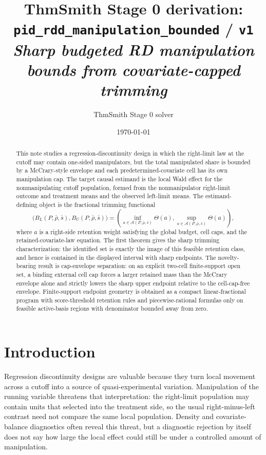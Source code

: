 \documentclass[11pt]{article}
\title{ThmSmith Stage 0 derivation: \texttt{pid\_rdd\_manipulation\_bounded} / \texttt{v1}%
  \\ \large\textit{Sharp budgeted RD manipulation bounds from covariate-capped trimming}}
\author{ThmSmith Stage 0 solver}
\date{\today}
\theoremstyle{definition}
\theoremstyle{plain}
\theoremstyle{remark}
\begin{document}
\maketitle


\begin{abstract}
This note studies a regression-discontinuity design in which the right-limit law at the
cutoff may contain one-sided manipulators, but the total manipulated share is bounded by a
McCrary-style envelope and each predetermined-covariate cell has its own manipulation cap.
The target causal estimand is the local Wald effect for the nonmanipulating cutoff
population, formed from the nonmanipulator right-limit outcome and treatment means and the
observed left-limit means.  The estimand-defining object is the fractional trimming
functional
\[
  \bigl(B_L(P,\bar\rho,\bar s),B_U(P,\bar\rho,\bar s)\bigr)
  =
  \left(\inf_{a\in\mathcal A(P,\bar\rho,\bar s)}\Theta(a),
  \sup_{a\in\mathcal A(P,\bar\rho,\bar s)}\Theta(a)\right),
\]
where \(a\) is a right-side retention weight satisfying the global budget, cell caps, and
the retained-covariate-law equation.  The first theorem gives the sharp trimming
characterization: the identified set is exactly the image of this feasible retention class,
and hence is contained in the displayed interval with sharp endpoints.  The novelty-bearing
result is cap-envelope separation: on an explicit two-cell finite-support open set, a
binding external cell cap forces a larger retained mass than the McCrary envelope alone
and strictly lowers the sharp upper endpoint relative to the cell-cap-free envelope.
Finite-support endpoint geometry is obtained as a compact linear-fractional program with
score-threshold retention rules and piecewise-rational formulas only on feasible
active-basis regions with denominator bounded away from zero.
\end{abstract}

\section{Introduction}
Regression discontinuity designs are valuable because they turn local movement across a
cutoff into a source of quasi-experimental variation.  Manipulation of the running
variable threatens that interpretation: the right-limit population may contain units that
selected into the treatment side, so the usual right-minus-left contrast need not compare
the same local population.  Density and covariate-balance diagnostics often reveal this
threat, but a diagnostic rejection by itself does not say how large the local effect could
still be under a controlled amount of manipulation.
\end{document}
